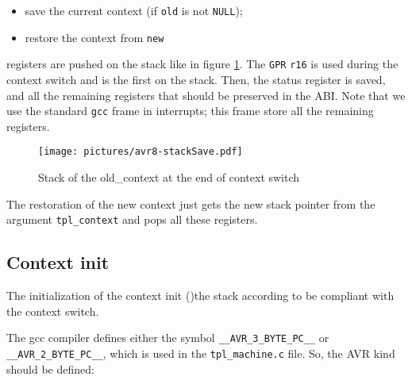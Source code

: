 \begin{itemize}
\item save the current context (if \texttt{old} is not \texttt{NULL});
\item restore the context from \texttt{new}
\end{itemize}

registers are pushed on the stack like in figure \ref{fig:avr8-stackSave}. The \texttt{GPR} \texttt{r16} is used during the context switch and is the first on the stack. Then, the status register is saved, and all the remaining registers that should be preserved in the ABI. Note that we use the standard \texttt{gcc} frame in interrupts; this frame store all the remaining registers.

\begin{figure}[htbp] %
\begin{minipage}{0.4\textwidth}
    \centering
  \texttt{[image: pictures/avr8-stackSave.pdf]} 
\end{minipage}
\begin{minipage}{0.6\textwidth}
  \caption{Stack of the old_context at the end of context switch}\label{fig:avr8-stackSave}
\end{minipage}
\end{figure}

The restoration of the new context just gets the new stack pointer from the argument \texttt{tpl_context} and pops all these registers.

\subsection{Context init}
The initialization of the context init ()the stack according to be compliant with the context switch. 


The gcc compiler defines either the symbol \texttt{\_\_AVR\_3\_BYTE\_PC\_\_} or \texttt{\_\_AVR\_2\_BYTE\_PC\_\_}, which is used in the \texttt{tpl\_machine.c} file.
So, the AVR kind should be defined:

